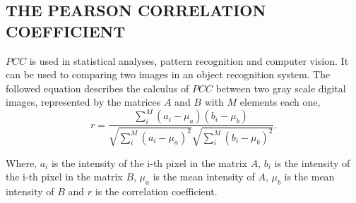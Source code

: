 
\subsection{THE PEARSON CORRELATION COEFFICIENT}

$PCC$ is used in statistical analyses, pattern recognition and computer vision. 
It can be used to comparing two images in an object recognition system. 
The followed equation describes the calculus of $PCC$ between two gray scale digital images\cite{Eugene},
represented by the matrices $A$ and $B$ with $M$ elements each one,
\begin{equation}
r = \frac{\sum \limits_{i}^{M} (a_i-\mu_a)(b_i-\mu_b)}{\sqrt{\sum \limits_{i}^{M} (a_i-\mu_a)^2} \sqrt{\sum\limits_{i}^{M} (b_i-\mu_b)^2}}.
\end{equation}

Where, $a_i$ is the intensity of the i-th pixel in the  matrix $A$, 
$b_i$ is the intensity of the i-th pixel in the matrix $B$, 
$\mu_a$ is the mean intensity of $A$,
$\mu_b$ is the mean intensity of $B$ and
$r$ is the correlation coefficient\cite{Miranda Neto}.
